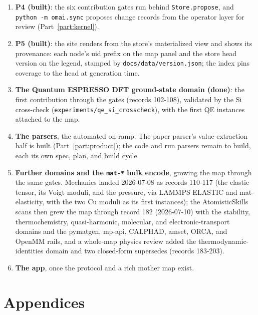\documentclass[11pt,a4paper]{article}
\begin{document}
\begin{enumerate}[leftmargin=2em, itemsep=0.2em]
  \item \textbf{P4 (built)}: the six contribution gates run behind
        \texttt{Store.propose}, and \texttt{python -m omai.sync} proposes
        change records from the operator layer for review
        (Part~\ref{part:kernel}).
  \item \textbf{P5 (built)}: the site renders from the store's materialized
        view and shows its provenance: each node's uid prefix on the map panel
        and the store head version on the legend, stamped by
        \texttt{docs/data/version.json}; the index pins coverage to the head at
        generation time.
  \item \textbf{The Quantum ESPRESSO DFT ground-state domain (done)}: the first
        contribution through the gates (records 102-108), validated by the Si
        cross-check (\texttt{experiments/qe\_si\_crosscheck}), with the first QE
        instances attached to the map.
  \item \textbf{The parsers}, the automated on-ramp. The paper parser's
        value-extraction half is built (Part~\ref{part:product}); the code and run
        parsers remain to build, each its own spec, plan, and build cycle.
  \item \textbf{Further domains and the \texttt{mat-*} bulk encode}, growing the
        map through the same gates. Mechanics landed 2026-07-08 as records
        110-117 (the elastic tensor, its Voigt moduli, and the pressure, via
        LAMMPS ELASTIC and mat-elasticity, with the two Cu moduli as its first
        instances); the AtomisticSkills scans then grew the map through record 182
        (2026-07-10) with the stability, thermochemistry, quasi-harmonic,
        molecular, and electronic-transport domains and the pymatgen, mp-api,
        CALPHAD, amset, ORCA, and OpenMM rails, and a whole-map physics review
        added the thermodynamic-identities domain and two closed-form supersedes
        (records 183-203).
  \item \textbf{The app}, once the protocol and a rich mother map exist.
\end{enumerate}

\appendix
\part*{Appendices}
\end{document}
